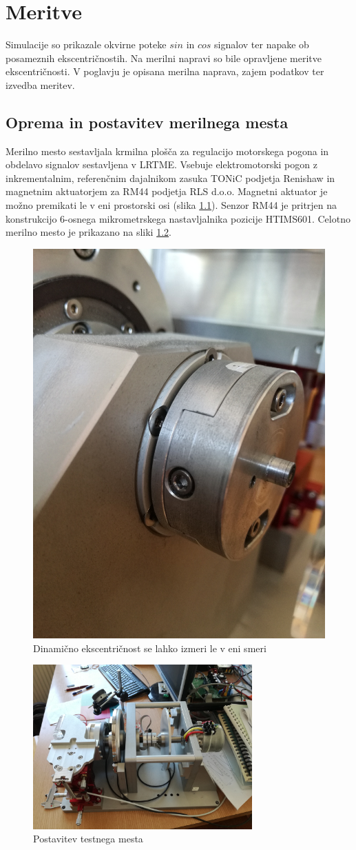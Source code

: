 \chapter{Meritve}
Simulacije so prikazale okvirne poteke $sin$ in $cos$ signalov ter napake  ob posameznih ekscentričnostih.
Na merilni napravi so bile opravljene meritve ekscentričnosti. V poglavju je opisana merilna naprava, zajem podatkov ter izvedba meritev.
\section{Oprema in postavitev merilnega mesta}
Merilno mesto sestavljala krmilna plošča za regulacijo motorskega pogona in obdelavo signalov sestavljena v LRTME.
Vsebuje elektromotorski pogon z inkrementalnim, referenčnim dajalnikom zasuka TONiC podjetja Renishaw in magnetnim aktuatorjem za RM44 podjetja RLS  d.o.o.
Magnetni aktuator je možno premikati le v eni prostorski osi (slika \ref{premikanjeMagneta}).
Senzor RM44 je pritrjen na konstrukcijo 6-osnega mikrometrskega nastavljalnika pozicije HTIMS601.
Celotno merilno mesto je prikazano na sliki \ref{postavitevmerilnegamesta.jpg}.
\begin{figure}[h]
	\centering
	\includegraphics[width=0.4\columnwidth]{./Slike/premikanjeMagneta.jpg}
	\caption{Dinamično ekscentričnost se lahko izmeri le v eni smeri}
	\label{premikanjeMagneta}
\end{figure}
\begin{figure}[h!]
	\centering
	\includegraphics[width=0.75\textwidth]{./Slike/postavitevmerilnegamesta.jpg}
	\caption{Postavitev testnega mesta}
	\label{postavitevmerilnegamesta.jpg}
\end{figure}
